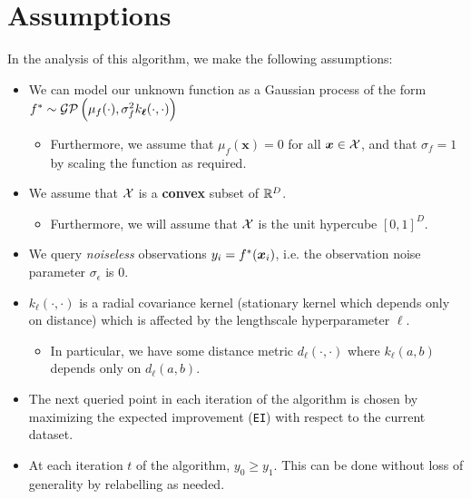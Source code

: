 \documentclass[11pt]{article}
\def\EI{\texttt{EI}}
\def\calGP{\mathcal{GP}}
\newcommand{\bs}[1]{\boldsymbol{#1}}
\def\bsx{\bs{x}}
\def\bell{\bs{\ell}}
\begin{document}
\section{Assumptions}

In the analysis of this algorithm, we make the following assumptions:

\begin{itemize}[label=]

  \item We can model our unknown function as a Gaussian process of the form $\fstar \sim \calGP\left(\mu_{f}(\cdot), \sigma_{f}^{2}k_{\bell}(\cdot, \cdot)\right)$
  \begin{itemize}[label=]
    \item Furthermore, we assume that $\mu_{f}(\bsx) = 0$ for all $\bsx \in \calX$, and that $\sigma_{f} = 1$ by scaling the function as required.
  \end{itemize}

  \item We assume that $\mathcal{X}$ is a \textbf{convex} subset of $\mathbb{R}^{D}$. 
  \begin{itemize}[label=]
    \item Furthermore, we will assume that $\mathcal{X}$ is the unit hypercube $[0, 1]^{D}$.
  \end{itemize}

  \item We query \textit{noiseless} observations $y_{i} = \fstar(\bsx_{i})$, i.e. the observation noise parameter $\sigma_{\epsilon}$ is 0. 

  \item $k_{\bell}(\cdot, \cdot)$ is a radial covariance kernel (stationary kernel which depends only on distance) which is affected by the lengthscale hyperparameter $\bell$.
  \begin{itemize}[label=]
    \item In particular, we have some distance metric $d_{\bell}(\cdot, \cdot)$ where $k_{\bell}(a, b)$ depends only on $d_{\bell}(a,b)$.
  \end{itemize}

  \item The next queried point in each iteration of the algorithm is chosen by maximizing the expected improvement (\EI{}) with respect to the current dataset. 

  \item At each iteration $t$ of the algorithm, $y_{0} \ge y_{1}$. This can be done without loss of generality by relabelling as needed.
\end{itemize}
\end{document}
